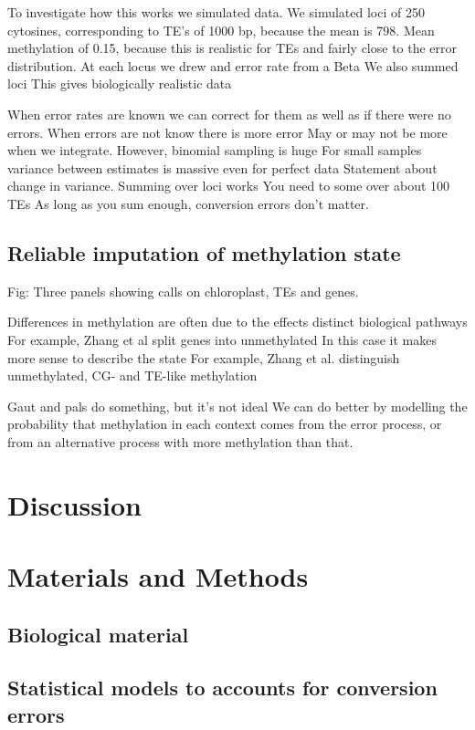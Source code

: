 \documentclass[12pt,longbibliography]{article}
\begin{document}
To investigate how this works we simulated data.
We simulated loci of 250 cytosines, corresponding to TE's of 1000 bp, because the mean is 798.
Mean methylation of 0.15, because this is realistic for TEs and fairly close to the error distribution.
At each locus we drew and error rate from a Beta
We also summed loci
This gives biologically realistic data

When error rates are known we can correct for them as well as if there were no errors.
When errors are not know there is more error
May or may not be more when we integrate.
However, binomial sampling is huge
For small samples variance between estimates is massive even for perfect data
Statement about change in variance.
Summing over loci works
You need to some over about 100 TEs
As long as you sum enough, conversion errors don't matter.

\subsection{Reliable imputation of methylation state}

Fig: Three panels showing calls on chloroplast, TEs and genes.

Differences in methylation are often due to the effects distinct biological pathways
For example, Zhang et al split genes into unmethylated 
In this case it makes more sense to describe the state
For example, Zhang et al. distinguish unmethylated, CG- and TE-like methylation

Gaut and pals do something, but it's not ideal
We can do better by modelling the probability that methylation in each context
comes from the error process, or from an alternative process with more methylation
than that.



\section{Discussion}

\section{Materials and Methods}

\subsection{Biological material}

\subsection{Statistical models to accounts for conversion errors}
\end{document}
